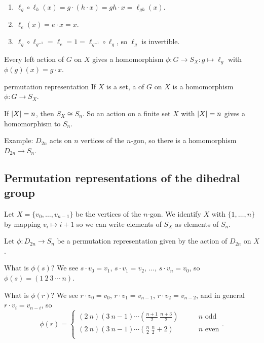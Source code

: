 \documentclass[12pt,letterpaper]{report}
\begin{document}
\begin{thmproof}
  \begin{enumerate}
    \item $\ell_g \circ \ell_h(x) = g \cdot (h \cdot x) = gh \cdot x = \ell_{gh}(x)$.
    \item $\ell_e(x) = e \cdot x = x$.
    \item $\ell_g \circ \ell_{g^{-1}} = \ell_e = 1 = \ell_{g^{-1}} \circ \ell_g$, so $\ell_g$ is
      invertible.
  \end{enumerate}
\end{thmproof}

\begin{cor}{}{}
  Every left action of $G$ on $X$ gives a homomorphism $\phi \colon G \to S_X : g \mapsto \ell_g$
  with $\phi(g)(x) = g \cdot x$.
\end{cor}

\begin{defn}{permutation representation}{}
  If $X$ is a set, a  of $G$ on $X$ is a homomorphism
  $\phi \colon G \to S_X$.
\end{defn}

If $\lvert X\rvert = n$, then $S_X \cong S_n$.
So an action on a finite set $X$ with $\lvert X\rvert = n$ gives a homomorphism to $S_n$.

Example: $D_{2n}$ acts on $n$ vertices of the $n$-gon, so there is a homomorphism $D_{2n} \to S_n$.

\pagebreak
\subsection{Permutation representations of the dihedral group}

Let $X = \{v_0, \ldots, v_{n - 1}\}$ be the vertices of the $n$-gon.
We identify $X$ with $\{1, \ldots, n\}$ by mapping $v_i \mapsto i + 1$ so we can write elements of
$S_X$ as elements of $S_n$.

Let $\phi \colon D_{2n} \to S_n$ be a permutation representation given by the action of $D_{2n}$ on
$X$.

What is $\phi(s)$?
We see $s \cdot v_0 = v_1$, $s \cdot v_1 = v_2$, $\ldots$, $s \cdot v_n = v_0$, so
$\phi(s) = (1 \ 2 \ 3 \ \cdots \ n)$.

What is $\phi(r)$?
We see $r \cdot v_0 = v_0$, $r \cdot v_1 = v_{n - 1}$, $r \cdot v_2 = v_{n - 2}$, and in general
$r \cdot v_i = v_{n - i}$, so
\[
  \phi(r) = \begin{cases}
    (2 \ n)(3 \ n - 1) \cdots (\frac{n + 1}{2} \ \frac{n + 3}{2}) \qquad & n \text { odd} \\
    (2 \ n)(3 \ n - 1) \cdots (\frac{n}{2} \ \frac{n}{2} + 2) \qquad & n \text { even} \\
  \end{cases}.
\]
\end{document}
